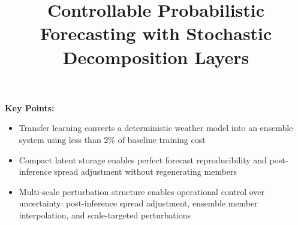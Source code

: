 \documentclass{agujournal2019}
\begin{document}
\title{Controllable Probabilistic Forecasting with Stochastic Decomposition Layers}




\textbf{Key Points:}
\begin{itemize}
\item Transfer learning converts a deterministic weather model into an ensemble system using less than 2\% of baseline training cost
\item Compact latent storage enables perfect forecast reproducibility and post-inference spread adjustment without regenerating members
\item Multi-scale perturbation structure enables operational control over uncertainty: post-inference spread adjustment, ensemble member interpolation, and scale-targeted perturbations
\end{itemize}
\end{document}
